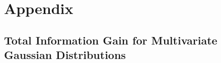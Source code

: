 \section{Appendix}



\subsection{Total Information Gain for Multivariate Gaussian Distributions}
\label{app:active_learning}

